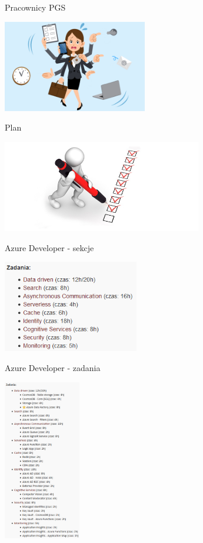 \documentclass{beamer}
\begin{document}
\begin{frame}{Pracownicy PGS}
	\begin{center}
		\includegraphics[height=4cm]{busy2.png}
	\end{center}
\end{frame}

\begin{frame}{Plan}
	\begin{center}
		\includegraphics[height=4cm]{tasks1.jpg}
	\end{center}
\end{frame}

\begin{frame}{Azure Developer - sekcje}
	\begin{center}
		\includegraphics[height=4cm]{azure_developer.png}
	\end{center}
\end{frame}

\begin{frame}{Azure Developer - zadania}
	\begin{center}
		\includegraphics[height=7cm]{azure_developer2.png}
	\end{center}
\end{frame}
\end{document}
